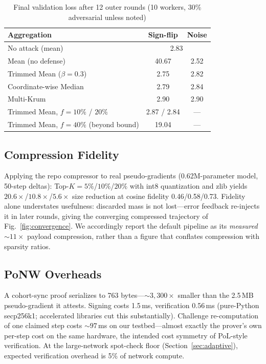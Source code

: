 \documentclass[conference]{IEEEtran}
\begin{document}
\begin{table}[t]
\caption{Final validation loss after 12 outer rounds (10 workers, 30\% adversarial unless noted)}
\label{tab:byz}
\centering
\begin{tabular}{@{}lcc@{}}
\toprule
\textbf{Aggregation} & \textbf{Sign-flip} & \textbf{Noise} \\
\midrule
No attack (mean) & \multicolumn{2}{c}{2.83} \\
\midrule
Mean (no defense) & 40.67 & 2.52 \\
Trimmed Mean ($\beta{=}0.3$)~\cite{yin2018byzantine} & 2.75 & 2.82 \\
Coordinate-wise Median~\cite{yin2018byzantine} & 2.79 & 2.84 \\
Multi-Krum~\cite{blanchard2017machine} & 2.90 & 2.90 \\
\midrule
Trimmed Mean, $f{=}10\%$ / $20\%$ & 2.87 / 2.84 & --- \\
Trimmed Mean, $f{=}40\%$ (beyond bound) & 19.04 & --- \\
\bottomrule
\end{tabular}
\end{table}

\subsection{Compression Fidelity}
\label{sec:eval-compression}

Applying the repo compressor to real pseudo-gradients (0.62M-parameter model, 50-step deltas): Top-$K{=}5\%$/$10\%$/$20\%$ with int8 quantization and zlib yields $20.6\times$/$10.8\times$/$5.6\times$ size reduction at cosine fidelity 0.46/0.58/0.73. Fidelity alone understates usefulness: discarded mass is not lost---error feedback re-injects it in later rounds, giving the converging compressed trajectory of Fig.~\ref{fig:convergence}. We accordingly report the default pipeline as its \emph{measured} ${\sim}11\times$ payload compression, rather than a figure that conflates compression with sparsity ratios.

\subsection{PoNW Overheads}
\label{sec:eval-ponw}

A cohort-sync proof serializes to 763 bytes---${\sim}3{,}300\times$ smaller than the 2.5\,MB pseudo-gradient it attests. Signing costs 1.5\,ms, verification 0.56\,ms (pure-Python secp256k1; accelerated libraries cut this substantially). Challenge re-computation of one claimed step costs ${\sim}97$\,ms on our testbed---almost exactly the prover's own per-step cost on the same hardware, the intended cost symmetry of PoL-style verification. At the large-network spot-check floor (Section~\ref{sec:adaptive}), expected verification overhead is 5\% of network compute.
\end{document}
